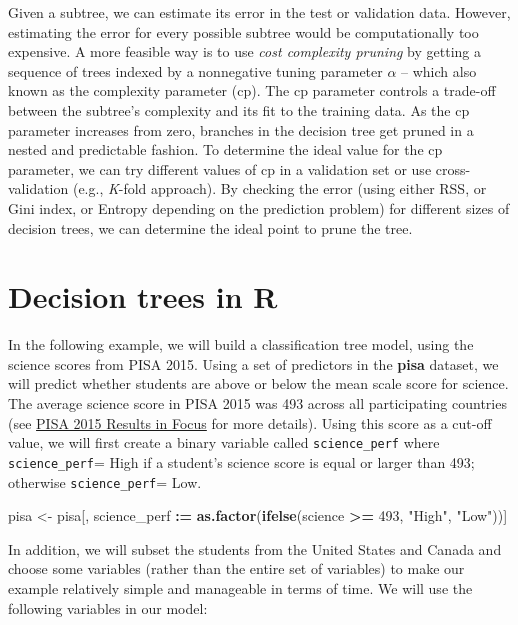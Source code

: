 \documentclass[]{book}
\newenvironment{Shaded}{\begin{snugshade}}{\end{snugshade}}
\newcommand{\DecValTok}[1]{\textcolor[rgb]{0.00,0.00,0.81}{#1}}
\newcommand{\ErrorTok}[1]{\textcolor[rgb]{0.64,0.00,0.00}{\textbf{#1}}}
\newcommand{\KeywordTok}[1]{\textcolor[rgb]{0.13,0.29,0.53}{\textbf{#1}}}
\newcommand{\NormalTok}[1]{#1}
\newcommand{\OperatorTok}[1]{\textcolor[rgb]{0.81,0.36,0.00}{\textbf{#1}}}
\newcommand{\StringTok}[1]{\textcolor[rgb]{0.31,0.60,0.02}{#1}}
\begin{document}
Given a subtree, we can estimate its error in the test or validation data. However, estimating the error for every possible subtree would be computationally too expensive. A more feasible way is to use \emph{cost complexity pruning} by getting a sequence of trees indexed by a nonnegative tuning parameter \(\alpha\) -- which also known as the complexity parameter (cp). The cp parameter controls a trade-off between the subtree's complexity and its fit to the training data. As the cp parameter increases from zero, branches in the decision tree get pruned in a nested and predictable fashion. To determine the ideal value for the cp parameter, we can try different values of cp in a validation set or use cross-validation (e.g., \emph{K}-fold approach). By checking the error (using either RSS, or Gini index, or Entropy depending on the prediction problem) for different sizes of decision trees, we can determine the ideal point to prune the tree.

\hypertarget{decision-trees-in-r}{%
\section{Decision trees in R}\label{decision-trees-in-r}}

In the following example, we will build a classification tree model, using the science scores from PISA 2015. Using a set of predictors in the \textbf{pisa} dataset, we will predict whether students are above or below the mean scale score for science. The average science score in PISA 2015 was 493 across all participating countries (see \href{https://www.oecd.org/pisa/pisa-2015-results-in-focus.pdf}{PISA 2015 Results in Focus} for more details). Using this score as a cut-off value, we will first create a binary variable called \texttt{science\_perf} where \texttt{science\_perf}= High if a student's science score is equal or larger than 493; otherwise \texttt{science\_perf}= Low.

\begin{Shaded}
\begin{Highlighting}[]
\NormalTok{pisa <-}\StringTok{ }\NormalTok{pisa[, science_perf }\OperatorTok{:}\ErrorTok{=}\StringTok{ }\KeywordTok{as.factor}\NormalTok{(}\KeywordTok{ifelse}\NormalTok{(science }\OperatorTok{>=}\StringTok{ }\DecValTok{493}\NormalTok{, }\StringTok{"High"}\NormalTok{, }\StringTok{"Low"}\NormalTok{))]}
\end{Highlighting}
\end{Shaded}

In addition, we will subset the students from the United States and Canada and choose some variables (rather than the entire set of variables) to make our example relatively simple and manageable in terms of time. We will use the following variables in our model:
\end{document}
